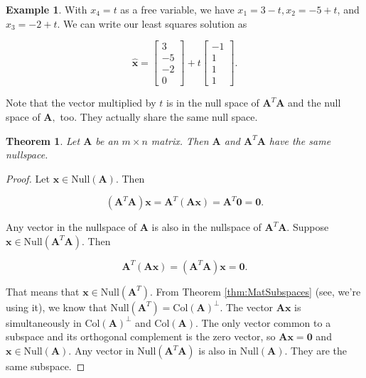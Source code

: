 \documentclass[
]{book}
\newtheorem{theorem}{Theorem}[chapter]
\theoremstyle{definition}
\theoremstyle{definition}
\newtheorem{example}{Example}[chapter]
\theoremstyle{definition}
\theoremstyle{definition}
\theoremstyle{remark}
\begin{document}
\begin{examplebox}
\begin{example}
With \(x_4=t\) as a free variable, we have \(x_1=3-t,x_2=-5+t\), and \(x_3=-2+t\). We can write our least squares solution as

\[\hat{\mathbf{x}}=\begin{bmatrix}3\\-5\\-2\\0\end{bmatrix}+t\begin{bmatrix}-1\\1\\1\\1\end{bmatrix}.\]

Note that the vector multiplied by \(t\) is in the null space of \(\mathbf{A}^T\mathbf{A}\) and the null space of \(\mathbf{A},\) too. They actually share the same null space.
\end{example}

\end{examplebox}

\begin{theorembox}

\begin{theorem}
Let \(\mathbf{A}\) be an \(m\times n\) matrix. Then \(\mathbf{A}\) and \(\mathbf{A}^T\mathbf{A}\) have the same nullspace.
\end{theorem}

\end{theorembox}

\begin{proof}
Let \(\mathbf{x}\in \text{Null}(\mathbf{A})\). Then

\[ (\mathbf{A}^T\mathbf{A})\mathbf{x}=\mathbf{A}^T(\mathbf{A}\mathbf{x})=\mathbf{A}^T\mathbf{0}=\mathbf{0}.\]

Any vector in the nullspace of \(\mathbf{A}\) is also in the nullspace of \(\mathbf{A}^T\mathbf{A}\). Suppose \(\mathbf{x}\in\text{Null}(\mathbf{A}^T\mathbf{A}).\) Then

\[\mathbf{A}^T(\mathbf{A}\mathbf{x})=(\mathbf{A}^T\mathbf{A})\mathbf{x}=\mathbf{0}.\]

That means that \(\mathbf{x}\in \text{Null}(\mathbf{A}^T).\) From Theorem \ref{thm:MatSubspaces} (see, we're using it), we know that \(\text{Null}(\mathbf{A}^T)=\text{Col}(\mathbf{A})^{\perp}.\) The vector \(\mathbf{A}\mathbf{x}\) is simultaneously in \(\text{Col}(\mathbf{A})^{\perp}\) and \(\text{Col}(\mathbf{A})\). The only vector common to a subspace and its orthogonal complement is the zero vector, so \(\mathbf{A}\mathbf{x}=\mathbf{0}\) and \(\mathbf{x}\in\text{Null}(\mathbf{A}).\) Any vector in \(\text{Null}(\mathbf{A}^T\mathbf{A})\) is also in \(\text{Null}(\mathbf{A}).\) They are the same subspace.
\end{proof}
\end{document}
